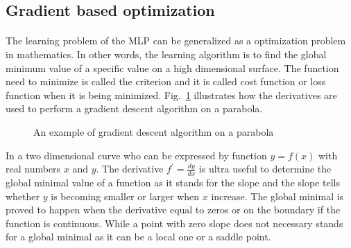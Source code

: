 \subsection{Gradient based optimization}
\paragraph{}
The learning problem of the MLP can be generalized as a optimization problem in mathematics.
In other words, the learning algorithm is to find the global minimum value of a specific value on a high dimensional surface.
The function need to minimize is called the criterion and it is called cost function or loss function when it is being minimized.
Fig.~\ref{lr_fig:ml_gradient_optimization} illustrates how the derivatives are used to perform a gradient descent algorithm on a parabola.
\begin{figure}
    \centering
    \caption{An example of gradient descent algorithm on a parabola}
    \label{lr_fig:ml_gradient_optimization}
\end{figure}

In a two dimensional curve who can be expressed by function $y=f(x)$ with real numbers $x$ and $y$.
The derivative $f^\prime=\frac{dy}{dx}$ is ultra useful to determine the global minimal value of a function as it stands for the slope and the slope tells whether $y$ is becoming smaller or larger when $x$ increase.
The global minimal is proved to happen when the derivative equal to zeros or on the boundary if the function is continuous.
While a point with zero slope does not necessary stands for a global minimal as it can be a local one or a saddle point.
